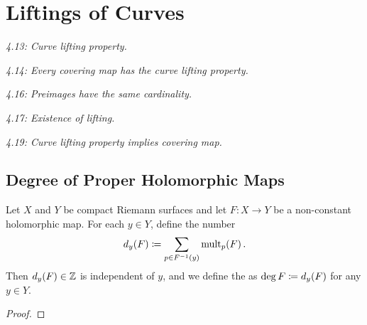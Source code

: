 \documentclass[../Moduli_Spaces_of_Riemann_Surfaces.tex]{subfiles}
\begin{document}
    \section{Liftings of Curves}\label{sec:liftings_of_curves}
    \begin{definition}
        \textit{4.13: Curve lifting property.}
    \end{definition}
    \begin{theorem}
        \textit{4.14: Every covering map has the curve lifting property.}
    \end{theorem}
    \begin{theorem}
        \textit{4.16: Preimages have the same cardinality.}
    \end{theorem}
    \begin{theorem}
        \textit{4.17: Existence of lifting.}
    \end{theorem}
    \begin{theorem}
        \textit{4.19: Curve lifting property implies covering map.}
    \end{theorem}
    \subsection{Degree of Proper Holomorphic Maps}\label{sec:degree_proper_holomorphic_map}
    \begin{defthm}
        Let $X$ and $Y$ be compact Riemann surfaces and let $F:X\to Y$ be a non-constant holomorphic map. For each $y\in Y$, define the number
        \begin{equation*}
            d_y\!\left(F\right)\coloneqq\sum_{p\in F^{-1}\left(y\right)}\operatorname{mult}_p\!\left(F\right).
        \end{equation*}
        Then $d_y\!\left(F\right)\in\mathbb{Z}$ is independent of $y$, and we define the  as $\deg F\coloneqq d_y\!\left(F\right)$ for any $y\in Y$.
    \end{defthm}
    \begin{proof}
        
    \end{proof}
\end{document}
